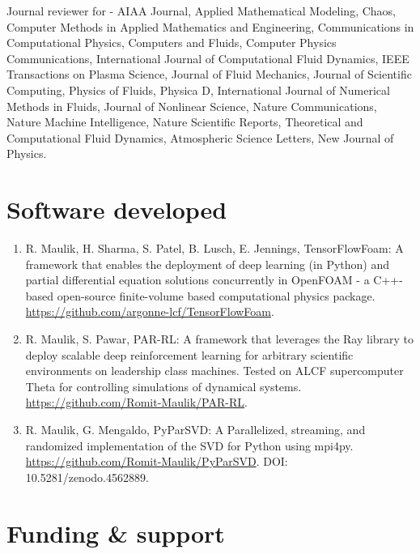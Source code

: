 \documentclass[letterpaper]{article}
\renewenvironment{itemize}{
  \begin{list}{}{
    \setlength{\leftmargin}{1.5em}
  }
}{
  \end{list}
}
\begin{document}
\begin{itemize}
  \item Journal reviewer for - AIAA Journal, Applied Mathematical Modeling, Chaos, Computer Methods in Applied Mathematics and Engineering, Communications in Computational Physics, Computers and Fluids, Computer Physics Communications, International Journal of Computational Fluid Dynamics, IEEE Transactions on Plasma Science, Journal of Fluid Mechanics, Journal of Scientific Computing, Physics of Fluids, Physica D, International Journal of Numerical Methods in Fluids, Journal of Nonlinear Science, Nature Communications, Nature Machine Intelligence, Nature Scientific Reports, Theoretical and Computational Fluid Dynamics, Atmospheric Science Letters, New Journal of Physics.
\end{itemize}

\section*{Software developed}

\begin{enumerate}

\item R. Maulik, H. Sharma, S. Patel, B. Lusch, E. Jennings, TensorFlowFoam: A framework that enables the deployment of deep learning (in Python) and partial differential equation solutions concurrently in OpenFOAM - a C++-based open-source finite-volume based computational physics package. \url{https://github.com/argonne-lcf/TensorFlowFoam}.

\item R. Maulik, S. Pawar, PAR-RL: A framework that leverages the Ray library to deploy scalable deep reinforcement learning for arbitrary scientific environments on leadership class machines. Tested on ALCF supercomputer Theta for controlling simulations of dynamical systems. \url{https://github.com/Romit-Maulik/PAR-RL}.

\item R. Maulik, G. Mengaldo, PyParSVD: A Parallelized, streaming, and randomized implementation of the SVD for Python using mpi4py. \url{https://github.com/Romit-Maulik/PyParSVD}. DOI: 10.5281/zenodo.4562889.

\end{enumerate}

\section*{Funding \& support}
\end{document}
